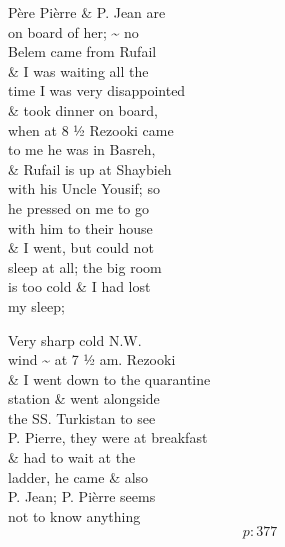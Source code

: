 \documentclass{report}
\begin{document}

	\par{
 	Père Pièrre \& P. Jean are\ \\on board of her; \~{} no\ \\Belem came from Rufail\ \\\& I was waiting all the\ \\time I was very disappointed\ \\\& took dinner on board,\ \\when at 8 ½ Rezooki came\ \\to me he was in Basreh,\ \\\& Rufail is up at Shaybieh\ \\with his Uncle Yousif; so\ \\he pressed on me to go\ \\with him to their house\ \\\& I went, but could not\ \\sleep at all; the big room\ \\is too cold \& I had lost\ \\my sleep;\ \\
	}

	\par{
 	Very sharp cold N.W.\ \\wind \~{} at 7 ½ am. Rezooki\ \\\& I went down to the quarantine\ \\station \& went alongside\ \\the SS. Turkistan to see\ \\P. Pierre, they were at breakfast\ \\\& had to wait at the\ \\ladder, he came \& also\ \\P. Jean; P. Pièrre seems\ \\not to know anything\ \\
  \[p: 377 \]

	}





\end{document}

